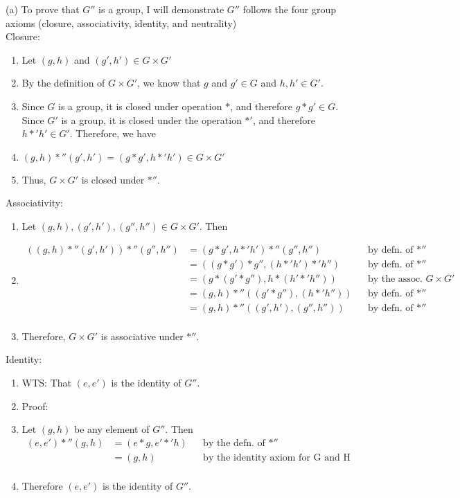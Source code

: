 
(a)
To prove that $G''$ is a group, I will demonstrate $G''$ follows the four
group axioms (closure, associativity, identity, and neutrality) \\

Closure:

\begin{enumerate}[nosep]
\item[] Let $(g, h)$ and $(g',h') \in G \times G'$ \\
\item[] By the definition of $G \times G'$, we know that $g$ and $g' \in G$ and $h, h' \in G'$. \\
\item[] Since $G$ is a group, it is closed under operation $*$, and therefore $g * g' \in G$. Since $G'$ is a group, it is closed under the operation $*'$, and therefore $h *' h' \in G'$. Therefore, we have \\
\item[] $(g,h) *'' (g', h') = (g * g', h *' h') \in G \times G'$ \\
\item[] Thus, $G \times G'$ is closed under $*''$.
\end{enumerate}

Associativity: 
\begin{enumerate}[nosep]
\item[] Let $(g,h), (g',h'), (g'',h'') \in G \times G'$. Then
\item[] \begin{align*}
  ((g,h) *'' (g',h')) *'' (g'',h'') &=
  (g * g', h *' h') *'' (g'',h'') & &\text{by defn. of $*''$} \\
  &= ((g * g') * g'', (h *' h') *' h'') & &\text{by defn. of $*''$} \\
  &= (g * (g' * g''), h * (h' *' h'')) & &\text{by the assoc. axiom for $G \times G'$} \\
  &= (g, h) *'' ((g' * g''), (h *' h'')) & &\text{by defn. of $*''$} \\
  &= (g, h) *'' ((g', h'), (g'', h'')) & &\text{by defn. of $*''$} \\
\end{align*}
\item[] Therefore, $G \times G'$ is associative under $*''$.
\end{enumerate}

Identity:
\begin{enumerate}[nosep]
\item[] WTS: That $(e,e')$ is the identity of $G''$.
\item[] Proof:
\item[] Let $(g,h)$ be any element of $G''$. Then
  \begin{align*}
    (e,e') *'' (g,h) &= (e * g, e' *' h) & &\text{by the defn. of $*''$} \\
    &= (g,h) & &\text{by the identity axiom for G and H} \\
  \end{align*}
\item[] Therefore $(e, e')$ is the identity of $G''$. 
\end{enumerate}

